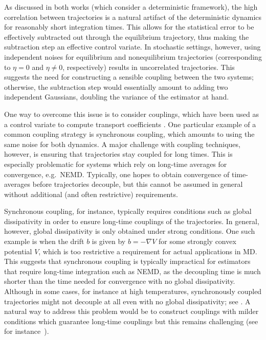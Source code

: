 As discussed in both works \cite{ciccotti1975,ciccotti1979} (which consider a deterministic framework), the high correlation between trajectories is a natural artifact of the deterministic dynamics for reasonably short integration times. This allows for the statistical error to be effectively subtracted out through the equilibrium trajectory, thus making the subtraction step an effective control variate. In stochastic settings, however, using independent noises for equilibrium and nonequilibrium trajectories (corresponding to $\eta=0$ and $\eta\ne 0$, respectively) results in uncorrelated trajectories. This suggests the need for constructing a sensible coupling between the two systems; otherwise, the subtraction step would essentially amount to adding two independent Gaussians, doubling the variance of the estimator at hand. 

One way to overcome this issue is to consider couplings, which have been used as a control variate to compute transport coefficients \cite{goodman2009,garnier2022}. One particular example of a common coupling strategy is synchronous coupling, which amounts to using the same noise for both dynamics. A major challenge with coupling techniques, however, is ensuring that trajectories stay coupled for long times.
This is especially problematic for systems which rely on long-time averages for convergence, e.g.\ NEMD. Typically, one hopes to obtain convergence of time-averages before trajectories decouple, but this cannot be assumed in general without additional (and often restrictive) requirements.

Synchronous coupling, for instance, typically requires conditions such as global dissipativity in order to ensure long-time couplings of the trajectories. In general, however, global dissipativity is only obtained under strong conditions. One such example is when the drift $b$ is given by $b=-\nabla V$ for some strongly convex potential $V$, which is too restrictive a requirement for actual applications in MD. This suggests that synchronous coupling is typically impractical for estimators that require long-time integration such as NEMD, as the decoupling time is much shorter than the time needed for convergence with no global dissipativity. Although in some cases, for instance at high temperatures, synchronously coupled trajectories might not decouple at all even with no global dissipativity; see \cite{monmarche2023}. A natural way to address this problem would be to construct couplings with milder conditions which guarantee long-time couplings but this remains challenging (see for instance~\cite{darshan2024}).

